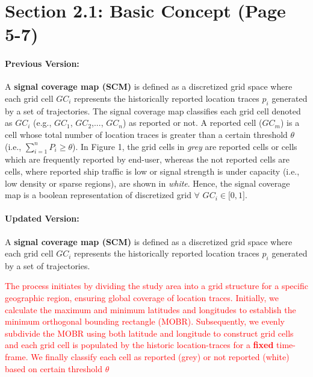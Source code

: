 \documentclass[twoside,leqno,onecolumn]{article}
\begin{document}
\section{Section 2.1: Basic Concept (Page 5-7)}

\paragraph{Previous Version: }
A \textbf{signal coverage map (SCM)} is defined as a discretized grid space where each grid cell $GC_{i}$ represents the historically reported location traces $p_{i}$ generated by a set of trajectories.
The signal coverage map classifies each grid cell denoted as $GC_{i}$ (e.g., $GC_{1}$, $GC_{2}$,..., $GC_{n}$) as reported or not. A reported cell ($GC_{m}$) is a cell whose total number of location traces is greater than a certain threshold $\theta$ (i.e., $\sum_{i=1}^{n} P_{i} \geq \theta$). In Figure 1, the grid cells in \textit{grey} are reported cells or cells which are frequently reported by end-user, whereas the not reported cells are cells, where reported ship traffic is low or signal strength is under capacity (i.e., low density or sparse regions), are shown in \textit{white}. Hence, the signal coverage map is a boolean representation of discretized grid $\forall$ $GC_{i} \in \lbrack0,1\rbrack$. 


\paragraph{Updated Version: }
A \textbf{signal coverage map (SCM)} is defined as a discretized grid space where each grid cell $GC_{i}$ represents the historically reported location traces $p_{i}$ generated by a set of trajectories.

\textcolor{red}{The process initiates by dividing the study area into a grid structure for a specific geographic region, ensuring global coverage of location traces. Initially, we calculate the maximum and minimum latitudes and longitudes to establish the minimum orthogonal bounding rectangle (MOBR). Subsequently, we evenly subdivide the MOBR using both latitude and longitude to construct grid cells and each grid cell is populated by the historic location-traces for a \textbf{fixed} time-frame. We finally classify each cell as reported (grey) or not reported (white) based on certain threshold $\theta$}
\end{document}
